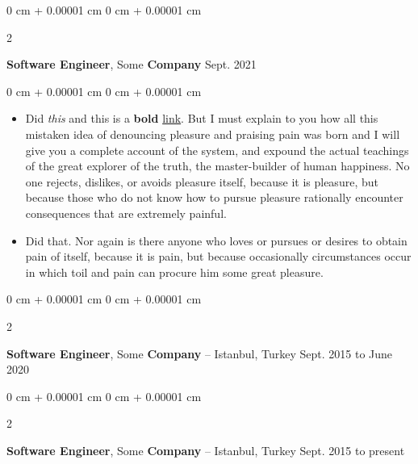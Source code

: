\documentclass[10pt, letterpaper]{article}
\newenvironment{highlights}{
    \begin{itemize}[
        topsep=0.10 cm,
        parsep=0.10 cm,
        partopsep=0pt,
        itemsep=0pt,
        leftmargin=0 cm + 10pt
    ]
}{
    \end{itemize}
} %
\newenvironment{onecolentry}{
    \begin{adjustwidth}{
        0 cm + 0.00001 cm
    }{
        0 cm + 0.00001 cm
    }
}{
    \end{adjustwidth}
} %
\newenvironment{twocolentry}[2][]{
    \onecolentry
    \def\secondColumn{#2}
    \setcolumnwidth{\fill, 4.5 cm}
    \begin{paracol}{2}
}{
    \switchcolumn \raggedleft \secondColumn
    \end{paracol}
    \endonecolentry
} %
\begin{document}
        \vspace{0.2 cm}

        \begin{twocolentry}{
            Sept. 2021
        }
            \textbf{Software Engineer}, Some \textbf{Company}\end{twocolentry}

        \vspace{0.10 cm}
        \begin{onecolentry}
            \begin{highlights}
                \item Did \textit{this} and this is a \textbf{bold} \href{https://example.com}{link}. But I must explain to you how all this mistaken idea of denouncing pleasure and praising pain was born and I will give you a complete account of the system, and expound the actual teachings of the great explorer of the truth, the master-builder of human happiness. No one rejects, dislikes, or avoids pleasure itself, because it is pleasure, but because those who do not know how to pursue pleasure rationally encounter consequences that are extremely painful.
                \item Did that. Nor again is there anyone who loves or pursues or desires to obtain pain of itself, because it is pain, but because occasionally circumstances occur in which toil and pain can procure him some great pleasure.
            \end{highlights}
        \end{onecolentry}


        \vspace{0.2 cm}

        \begin{twocolentry}{
            Sept. 2015 to June 2020
        }
            \textbf{Software Engineer}, Some \textbf{Company} -- Istanbul, Turkey\end{twocolentry}



        \vspace{0.2 cm}

        \begin{twocolentry}{
            Sept. 2015 to present
        }
            \textbf{Software Engineer}, Some \textbf{Company} -- Istanbul, Turkey\end{twocolentry}
\end{document}
